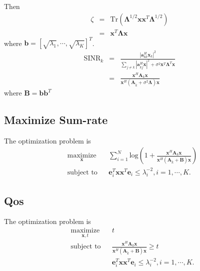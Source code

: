 \documentclass[12pt,journal,draftclsnofoot,onecolumn]{IEEEtran}
\begin{document}
Then
\begin{eqnarray}
\zeta &=& \mathrm{Tr}(\mathbf{\Lambda}^{1/2}\mathbf{x}\mathbf{x}^T\mathbf{\Lambda}^{1/2})\\
&=&\mathbf{x}^T\mathbf{\Lambda}\mathbf{x}
\end{eqnarray}
where $\mathbf{b} = [\sqrt{\lambda_1},\cdots,\sqrt{\lambda_K}]^T$.
\begin{eqnarray}
\mathrm{SINR}_k &=& \frac{|\mathbf{a}_{kk}^H\mathbf{x}_k|^2}{\sum_{j \neq k}|\mathbf{a}_{kj}^H\mathbf{x}|^2 + \sigma^2\mathbf{x}^T\mathbf{\Lambda}^T\mathbf{x}}\\
&=&  \frac{\mathbf{x}^H\mathbf{A}_k\mathbf{x}}{\mathbf{x}^H\left(\mathbf{A}_{\tilde{k}} + \sigma^2\mathbf{\Lambda}\right)\mathbf{x}}
	\end{eqnarray}
where $\mathbf{B} = \mathbf{b}\mathbf{b}^T$

\subsection{Maximize Sum-rate}
The optimization problem is
\begin{equation}
\begin{aligned} \label{eq:problem2}
& \underset{\mathbf{x}}{\text{maximize}}
& & \sum_{i = 1}^{N}\mathrm{log}(1 + \frac{\mathbf{x}^H\mathbf{A}_k\mathbf{x}}{\mathbf{x}^H \left(\mathbf{A}_{\tilde{k}} + \mathbf{B}\right)\mathbf{x}}) \\
& \text{subject to}
& &  \mathbf{e}_i^T\mathbf{x}\mathbf{x}^T\mathbf{e}_i \leq \lambda_i^{-2}, i=1, \cdots, K.
\end{aligned}
\end{equation}


\subsection{Qos}
The optimization problem is
\begin{equation}
\begin{aligned} \label{eq:problem2}
& \underset{\mathbf{x},t}{\text{maximize}}
& & t \\
& \text{subject to}
& &  \frac{\mathbf{x}^H\mathbf{A}_k\mathbf{x}}{\mathbf{x}^H \left(\mathbf{A}_{\tilde{k}} + \mathbf{B}\right)\mathbf{x}} \geq t\\
&&&\mathbf{e}_i^T\mathbf{x}\mathbf{x}^T\mathbf{e}_i \leq \lambda_i^{-2}, i=1, \cdots, K.
\end{aligned}
\end{equation}
\end{document}
